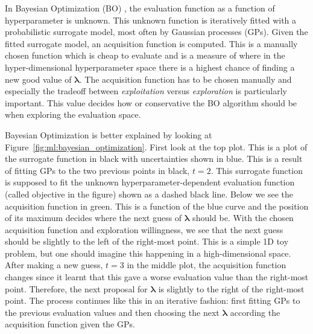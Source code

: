 In Bayesian Optimization (BO) \autocite{brochuTutorialBayesianOptimization2010}, the evaluation function as a function of hyperparameter is unknown. This unknown function is iteratively fitted with a probabilistic surrogate model, most often by Gaussian processes (GPs). Given the fitted surrogate model, an acquisition function is computed. This is a manually chosen function which is cheap to evaluate and is a measure of where in the hyper-dimensional hyperparameter space there is a highest chance of finding a new good value of $\bm{\lambda}$. The acquisition function has to be chosen manually and especially the tradeoff between \emph{exploitation} versus \emph{exploration} is particularly important. This value decides how  or conservative the BO algorithm should be when exploring the evaluation space. 

Bayesian Optimization is better explained by looking at Figure~\ref{fig:ml:bayesian_optimization}. First look at the top plot. This is a plot of the surrogate function in black with uncertainties shown in blue. This is a result of fitting GPs to the two previous points in black, $t=2$. This surrogate function is supposed to fit the unknown hyperparameter-dependent evaluation function (called objective in the figure) shown as a dashed black line. Below we see the acquisition function in green. This is a function of the blue curve and the position of its maximum decides where the next guess of $\bm{\lambda}$ should be. With the chosen acquisition function and exploration willingness, we see that the next guess should be slightly to the left of the right-most point. This is a simple 1D toy problem, but one should imagine this happening in a high-dimensional space. After making a new guess, $t=3$ in the middle plot, the acquisition function changes since it learnt that this gave a worse evaluation value than the right-most point. Therefore, the next proposal for $\bm{\lambda}$ is slightly to the right of the right-most point. The process continues like this in an iterative fashion: first fitting GPs to the previous evaluation values and then choosing the next $\bm{\lambda}$ according the acquisition function given the GPs. 

